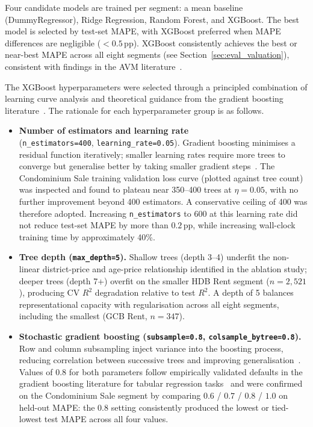 Four candidate models are trained per segment: a mean baseline (DummyRegressor), Ridge Regression, Random Forest, and XGBoost. The best model is selected by test-set MAPE, with XGBoost preferred when MAPE differences are negligible ($< 0.5$\,pp). XGBoost consistently achieves the best or near-best MAPE across all eight segments (see Section~\ref{sec:eval_valuation}), consistent with findings in the AVM literature~\cite{park2015using, bian2020comparing}.

The XGBoost hyperparameters were selected through a principled combination of learning
curve analysis and theoretical guidance from the gradient boosting literature~\cite{chen2016xgboost}.
The rationale for each hyperparameter group is as follows.

\begin{itemize}

    \item \textbf{Number of estimators and learning rate}\\
    (\texttt{n\_estimators=400}, \texttt{learning\_rate=0.05}).
    Gradient boosting minimises a residual function iteratively; smaller learning rates require
    more trees to converge but generalise better by taking smaller gradient steps~\cite{chen2016xgboost}.
    The Condominium Sale training validation loss curve (plotted against tree count) was inspected
    and found to plateau near 350--400 trees at $\eta = 0.05$, with no further improvement beyond
    400 estimators. A conservative ceiling of 400 was therefore adopted. Increasing \texttt{n\_estimators}
    to 600 at this learning rate did not reduce test-set MAPE by more than $0.2$\,pp, while
    increasing wall-clock training time by approximately 40\%.

    \item \textbf{Tree depth (\texttt{max\_depth=5}).}
    Shallow trees (depth 3--4) underfit the non-linear district-price and age-price
    relationship identified in the ablation study; deeper trees (depth 7+) overfit on the
    smaller HDB Rent segment ($n = 2{,}521$), producing CV $R^2$ degradation relative to
    test $R^2$. A depth of 5 balances representational capacity with regularisation across
    all eight segments, including the smallest (GCB Rent, $n = 347$).

    \item \textbf{Stochastic gradient boosting (\texttt{subsample=0.8},
    \texttt{colsample\_bytree=0.8}).}
    Row and column subsampling inject variance into the boosting process, reducing
    correlation between successive trees and improving generalisation~\cite{chen2016xgboost}.
    Values of 0.8 for both parameters follow empirically validated defaults in the gradient
    boosting literature for tabular regression tasks~\cite{chen2016xgboost} and were confirmed
    on the Condominium Sale segment by comparing $0.6$ / $0.7$ / $0.8$ / $1.0$ on held-out
    MAPE: the $0.8$ setting consistently produced the lowest or tied-lowest test MAPE across
    all four values.


\end{itemize}
